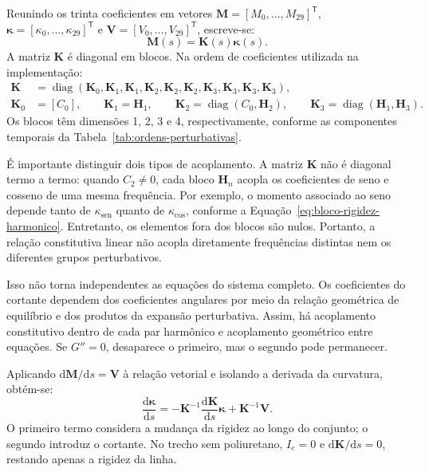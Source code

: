 \documentclass[arial,centeredequations,english,brazilian,oneside,section=TITLE]{ifes8}
\begin{document}
Reunindo os trinta coeficientes em vetores
$\boldsymbol M=[M_0,\ldots,M_{29}]^{\mathsf T}$,
$\boldsymbol\kappa=[\kappa_0,\ldots,\kappa_{29}]^{\mathsf T}$ e
$\boldsymbol V=[V_0,\ldots,V_{29}]^{\mathsf T}$, escreve-se:
\begin{equation}
  \boldsymbol M(s)=\mathbf K(s)\boldsymbol\kappa(s).
  \label{eq:momento-curvatura-vetorial-linear}
\end{equation}
A matriz $\mathbf K$ é diagonal em blocos. Na ordem de coeficientes utilizada
na implementação:
\begin{align}
  \mathbf K&=\operatorname{diag}
    (\mathbf K_0,\mathbf K_1,\mathbf K_1,
     \mathbf K_2,\mathbf K_2,\mathbf K_2,
     \mathbf K_3,\mathbf K_3,\mathbf K_3,\mathbf K_3),
    \label{eq:matriz-rigidez-global-linear}\\
  \mathbf K_0&=[C_0],\qquad
  \mathbf K_1=\mathbf H_1,\qquad
  \mathbf K_2=\operatorname{diag}(C_0,\mathbf H_2),\qquad
  \mathbf K_3=\operatorname{diag}(\mathbf H_1,\mathbf H_3).
    \label{eq:blocos-por-ordem-linear}
\end{align}
Os blocos têm dimensões 1, 2, 3 e 4, respectivamente, conforme as componentes
temporais da Tabela~\ref{tab:ordens-perturbativas}.

É importante distinguir dois tipos de acoplamento. A matriz $\mathbf K$ não é
diagonal termo a termo: quando $C_2\neq0$, cada bloco $\mathbf H_n$ acopla os
coeficientes de seno e cosseno de uma mesma frequência. Por exemplo, o momento
associado ao seno depende tanto de $\kappa_{\mathrm{sen}}$ quanto de
$\kappa_{\mathrm{cos}}$, conforme a
Equação~\eqref{eq:bloco-rigidez-harmonico}. Entretanto, os elementos fora dos
blocos são nulos. Portanto, a relação constitutiva linear não acopla diretamente
frequências distintas nem os diferentes grupos perturbativos.

Isso não torna independentes as equações do sistema completo. Os coeficientes
do cortante dependem dos coeficientes angulares por meio da relação geométrica
de equilíbrio e dos produtos da expansão perturbativa. Assim, há acoplamento
constitutivo dentro de cada par harmônico e acoplamento geométrico entre
equações. Se $G''=0$, desaparece o primeiro, mas o segundo pode permanecer.

Aplicando $\mathrm{d}\boldsymbol M/\mathrm{d}s=\boldsymbol V$ à relação
vetorial e isolando a derivada da curvatura, obtém-se:
\begin{equation}
  \frac{\mathrm{d}\boldsymbol\kappa}{\mathrm{d}s}
  =-\mathbf K^{-1}\frac{\mathrm{d}\mathbf K}{\mathrm{d}s}
    \boldsymbol\kappa+\mathbf K^{-1}\boldsymbol V.
  \label{eq:governo-linear-vetorial}
\end{equation}
O primeiro termo considera a mudança da rigidez ao longo do conjunto; o segundo
introduz o cortante. No trecho sem poliuretano, $I_e=0$ e
$\mathrm{d}\mathbf K/\mathrm{d}s=0$, restando apenas a rigidez da linha.
\end{document}
